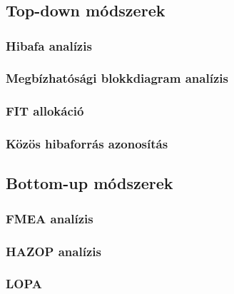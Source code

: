 \chapter{\analysis}
\section{Top-down módszerek}
\subsection{Hibafa analízis}

\subsection{Megbízhatósági blokkdiagram analízis}

\subsection{FIT allokáció}

\subsection{Közös hibaforrás azonosítás}

\section{Bottom-up módszerek}
\subsection{FMEA analízis}

\subsection{HAZOP analízis}

\subsection{LOPA}